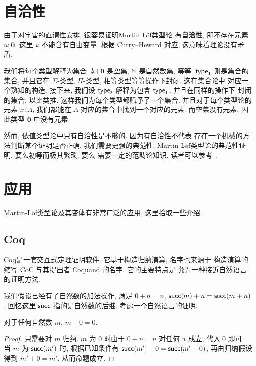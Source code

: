 \section{自洽性}

由于对宇宙的直谓性安排, 很容易证明Martin-L\"of类型论
有\textbf{自洽性}, 即不存在元素 \(u : \mathbf 0\).
这里 \(u\) 不能含有自由变量. 根据 Curry--Howard 对应,
这意味着理论没有矛盾.

我们将每个类型解释为集合. 如 \(\mathbf 0\) 是空集,
\(\mathbb{N}\) 是自然数集, 等等. \(\textsf{type}_1\)
则是集合的集合, 并且它在 \(\Sigma\)-类型,
\(\Pi\)-类型, 相等类型等等操作下封闭. 这在集合论中
对应一个熟知的构造. 接下来, 我们设 \(\textsf{type}_2\)
解释为包含 \(\textsf{type}_1\), 并且在同样的操作下
封闭的集合, 以此类推. 这样我们为每个类型都赋予了一个集合.
并且对于每个类型论的元素 \(x : A\), 我们都能在 \(A\)
对应的集合中找到一个对应的元素. 而空集没有元素, 因此类型
\(\mathbf 0\) 中没有元素.

然而, 依值类型论中只有自洽性是不够的. 因为有自洽性不代表
存在一个机械的方法判断某个证明是否正确. 我们需要更强的典范性.
Martin-L\"of类型论的典范性证明, 要么初等而极其繁琐, 要么
需要一定的范畴论知识. 读者可以参考~\cite[\S5.6]{sterling:2021:thesis}.

\section{应用}

Martin-L\"of类型论及其变体有非常广泛的应用, 这里拾取一些介绍.

\subsection{Coq}

Coq是一套交互式定理证明软件. 它基于构造归纳演算, 名字也来源于
构造演算的缩写 CoC 与其提出者 Coquand 的名字. 它的主要特点是
允许一种接近自然语言的证明方法.

我们假设已经有了自然数的加法操作, 满足 \(0 + n = n\),
\(\textsf{succ}(m) + n = \textsf{succ}(m+n)\). 回忆这里
\(\textsf{succ}\) 指的是自然数的后继. 考虑一个自然语言的证明.
\begin{theorem}
对于任何自然数 \(m\), \(m+0 = 0\).
\end{theorem}
\begin{proof}
只需要对 \(m\) 归纳. \(m\) 为 \(0\) 时由于 \(0 + n = n\)
对任何 \(n\) 成立, 代入 \(0\) 即可. 当 \(m\) 为
\(\textsf{succ}(m')\) 时, 根据已知条件有
\(\textsf{succ}(m') + 0 = \textsf{succ}(m'+0)\),
再由归纳假设得到 \(m' + 0 = m'\), 从而命题成立.
\end{proof}

